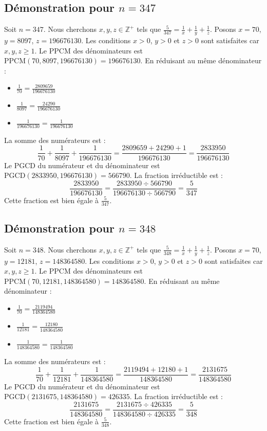 \documentclass[11pt,a4paper]{article}
\begin{document}
\subsection{Démonstration pour $n = 347$}
Soit $n = 347$. Nous cherchons $x, y, z \in \mathbb{Z}^{+}$ tels que $\frac{5}{347} = \frac{1}{x} + \frac{1}{y} + \frac{1}{z}$.
Posons $x = 70$, $y = 8097$, $z = 196676130$.
Les conditions $x > 0$, $y > 0$ et $z > 0$ sont satisfaites car $x, y, z \geq 1$.
Le PPCM des dénominateurs est $\text{PPCM}(70, 8097, 196676130) = 196676130$.
En réduisant au même dénominateur :
\begin{itemize}
    \item $\frac{1}{70} = \frac{2809659}{196676130}$
    \item $\frac{1}{8097} = \frac{24290}{196676130}$
    \item $\frac{1}{196676130} = \frac{1}{196676130}$
\end{itemize}
La somme des numérateurs est :
$$ \frac{1}{70} + \frac{1}{8097} + \frac{1}{196676130} = \frac{2809659 + 24290 + 1}{196676130} = \frac{2833950}{196676130} $$
Le PGCD du numérateur et du dénominateur est $\text{PGCD}(2833950, 196676130) = 566790$.
La fraction irréductible est :
$$ \frac{2833950}{196676130} = \frac{2833950 \div 566790}{196676130 \div 566790} = \frac{5}{347} $$
Cette fraction est bien égale à $\frac{5}{347}$.

\subsection{Démonstration pour $n = 348$}
Soit $n = 348$. Nous cherchons $x, y, z \in \mathbb{Z}^{+}$ tels que $\frac{5}{348} = \frac{1}{x} + \frac{1}{y} + \frac{1}{z}$.
Posons $x = 70$, $y = 12181$, $z = 148364580$.
Les conditions $x > 0$, $y > 0$ et $z > 0$ sont satisfaites car $x, y, z \geq 1$.
Le PPCM des dénominateurs est $\text{PPCM}(70, 12181, 148364580) = 148364580$.
En réduisant au même dénominateur :
\begin{itemize}
    \item $\frac{1}{70} = \frac{2119494}{148364580}$
    \item $\frac{1}{12181} = \frac{12180}{148364580}$
    \item $\frac{1}{148364580} = \frac{1}{148364580}$
\end{itemize}
La somme des numérateurs est :
$$ \frac{1}{70} + \frac{1}{12181} + \frac{1}{148364580} = \frac{2119494 + 12180 + 1}{148364580} = \frac{2131675}{148364580} $$
Le PGCD du numérateur et du dénominateur est $\text{PGCD}(2131675, 148364580) = 426335$.
La fraction irréductible est :
$$ \frac{2131675}{148364580} = \frac{2131675 \div 426335}{148364580 \div 426335} = \frac{5}{348} $$
Cette fraction est bien égale à $\frac{5}{348}$.
\end{document}
